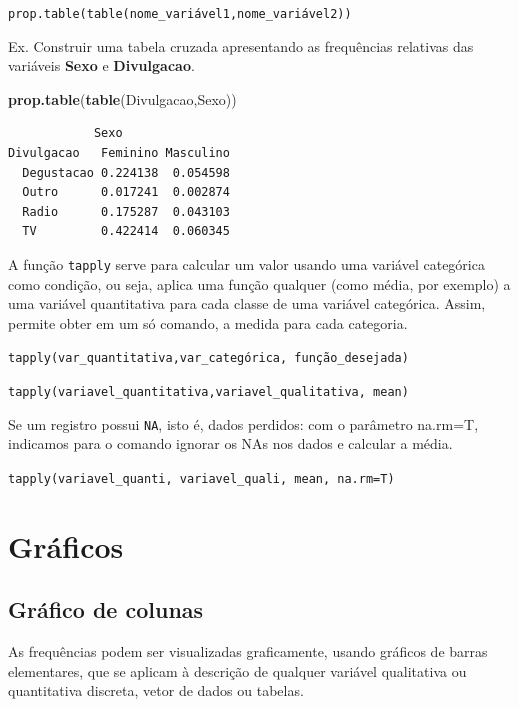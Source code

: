 \documentclass[12pt,brazil,oneside]{book}
\newenvironment{Shaded}{\begin{snugshade}}{\end{snugshade}}
\newcommand{\KeywordTok}[1]{\textcolor[rgb]{0.13,0.29,0.53}{\textbf{#1}}}
\newcommand{\NormalTok}[1]{#1}
\begin{document}
\texttt{prop.table(table(nome\_variável1,nome\_variável2))}

Ex. Construir uma tabela cruzada apresentando as frequências relativas das variáveis \textbf{Sexo} e \textbf{Divulgacao}.

\begin{Shaded}
\begin{Highlighting}[]
\KeywordTok{prop.table}\NormalTok{(}\KeywordTok{table}\NormalTok{(Divulgacao,Sexo))}
\end{Highlighting}
\end{Shaded}

\begin{verbatim}
            Sexo
Divulgacao   Feminino Masculino
  Degustacao 0.224138  0.054598
  Outro      0.017241  0.002874
  Radio      0.175287  0.043103
  TV         0.422414  0.060345
\end{verbatim}

A função \texttt{tapply} serve para calcular um valor usando uma variável categórica como condição, ou seja, aplica uma função qualquer (como média, por exemplo) a uma variável quantitativa para cada classe de uma variável categórica. Assim, permite obter em um só comando, a medida para cada categoria.

\texttt{tapply(var\_quantitativa,var\_categórica,\ função\_desejada)}

\texttt{tapply(variavel\_quantitativa,variavel\_qualitativa,\ mean)}

Se um registro possui \texttt{NA}, isto é, dados perdidos: com o parâmetro na.rm=T, indicamos para o comando ignorar os NAs nos dados e calcular a média.

\texttt{tapply(variavel\_quanti,\ variavel\_quali,\ mean,\ na.rm=T)}

\hypertarget{graficos}{%
\section{Gráficos}\label{graficos}}

\hypertarget{grafico-de-colunas}{%
\subsection{Gráfico de colunas}\label{grafico-de-colunas}}

As frequências podem ser visualizadas graficamente, usando gráficos de barras elementares, que se aplicam à descrição de qualquer variável qualitativa ou quantitativa discreta, vetor de dados ou tabelas.
\end{document}
